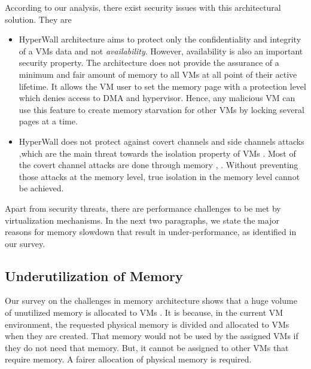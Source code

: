 \documentclass[a4paper,10pt,twocolumn]{article}
\begin{document}
  According to our analysis, there exist security issues with this architectural solution. They are

 \begin{itemize}

  \item HyperWall architecture aims to protect only the confidentiality and integrity of a VMs data and not \textit{availability}. However, availability is also an important security property. The architecture does not provide the assurance of  a minimum and fair amount of memory to all VMs at all point of their active lifetime. It allows the VM user to set the memory page with a protection level which denies access to DMA and hypervisor. Hence, any malicious VM can use this feature to create memory starvation for other VMs by locking several pages at a time.

  \item  HyperWall does not protect against covert channels and side channels attacks \cite{szefer2012architectural},which are the main threat towards the isolation property of VMs \cite{jithin2014virtual}. Most of the covert channel attacks are done through memory \cite{Xiao:2012:CCC:2382196.2382318}, \cite{barham2003xen} \cite{wu2011identification} \cite{Xu:2011:ELC:2046660.2046670}. Without preventing those attacks at the memory level, true isolation in the memory level cannot be achieved.

 \end{itemize}

  Apart from security threats, there are performance challenges to be met by virtualization mechanisms. In the next two paragraphs, we state  the major reasons for memory slowdown that result in under-performance, as identified in our survey.

 \subsection{Underutilization of Memory}

  Our survey on the challenges in memory architecture shows that a huge volume of unutilized memory is allocated to VMs \cite{agmon2014ginseng} \cite{hwang2014mortar}. It is because, in the current VM environment, the requested physical memory is divided and allocated to VMs when they are created. That memory would not be used by the assigned VMs if they do not need that memory. But, it cannot be assigned to other VMs that require memory. A fairer allocation of physical memory is required.
\end{document}

